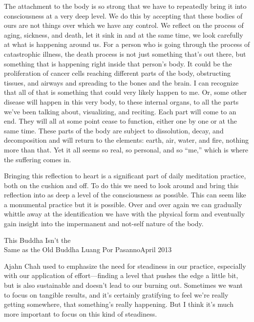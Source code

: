 The attachment to the body is so strong that we have to repeatedly 
bring it into consciousness at a very deep level. We do this by 
accepting that these bodies of ours are not things over which we have 
any control. We reflect on the process of aging, sickness, and death, 
let it sink in and at the same time, we look carefully at what is 
happening around us. For a person who is going through the process of 
catastrophic illness, the death process is not just something that's 
out there, but something that is happening right inside that person's 
body. It could be the proliferation of cancer cells reaching different 
parts of the body, obstructing tissues, and airways and spreading to 
the bones and the brain. I can recognize that all of that is something 
that could very likely happen to me. Or, some other disease will happen 
in this very body, to these internal organs, to all the parts we've 
been talking about, visualizing, and reciting. Each part will come to 
an end. They will all at some point cease to function, either one by 
one or at the same time. These parts of the body are subject to 
dissolution, decay, and decomposition and will return to the elements: 
earth, air, water, and fire, nothing more than that. Yet it all seems 
so real, so personal, and so ``me,'' which is where the suffering comes 
in.

Bringing this reflection to heart is a significant part of daily 
meditation practice, both on the cushion and off. To do this we need to 
look around and bring this reflection into as deep a level of the 
consciousness as possible. This can seem like a monumental practice but 
it is possible. Over and over again we can gradually whittle away at 
the identification we have with the physical form and eventually gain 
insight into the impermanent and not-self nature of the body.

{This Buddha Isn't the\\Same as the Old Buddha}
{Luang Por Pasanno}{April 2013}

Ajahn Chah used to emphasize the need for steadiness in our practice, 
especially with our application of effort---finding a level that pushes 
the edge a little bit, but is also sustainable and doesn't lead to our 
burning out. Sometimes we want to focus on tangible results, and it's 
certainly gratifying to feel we're really getting somewhere, that 
something's really happening. But I think it's much more important to 
focus on this kind of steadiness.

